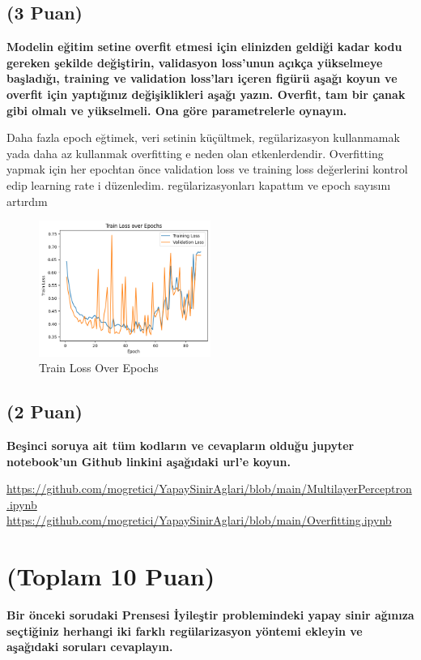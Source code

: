 \documentclass[11pt]{article}
\begin{document}
\subsection{(3 Puan)} \textbf{Modelin eğitim setine overfit etmesi için elinizden geldiği kadar kodu gereken şekilde değiştirin, validasyon loss'unun açıkça yükselmeye başladığı, training ve validation loss'ları içeren figürü aşağı koyun ve overfit için yaptığınız değişiklikleri aşağı yazın. Overfit, tam bir çanak gibi olmalı ve yükselmeli. Ona göre parametrelerle oynayın.}

Daha fazla epoch eğtimek, veri setinin küçültmek, regülarizasyon kullanmamak yada daha az kullanmak overfitting e neden olan etkenlerdendir. Overfitting yapmak için her epochtan önce validation loss ve training loss değerlerini kontrol edip learning rate i düzenledim. regülarizasyonları kapattım ve epoch sayısını artırdım 

\begin{figure}[ht!]
    \centering
    \includegraphics[width=0.5\textwidth]{overfitting.png}
    \caption{Train Loss Over Epochs }
    \label{fig:figure}
\end{figure}

\subsection{(2 Puan)} \textbf{Beşinci soruya ait tüm kodların ve cevapların olduğu jupyter notebook'un Github linkini aşağıdaki url'e koyun.}

\url{https://github.com/mogretici/YapaySinirAglari/blob/main/MultilayerPerceptron.ipynb}\newline
\url{https://github.com/mogretici/YapaySinirAglari/blob/main/Overfitting.ipynb}

\section{(Toplam 10 Puan)} \textbf{Bir önceki sorudaki Prensesi İyileştir problemindeki yapay sinir ağınıza seçtiğiniz herhangi iki farklı regülarizasyon yöntemi ekleyin ve aşağıdaki soruları cevaplayın.} 
\end{document}

